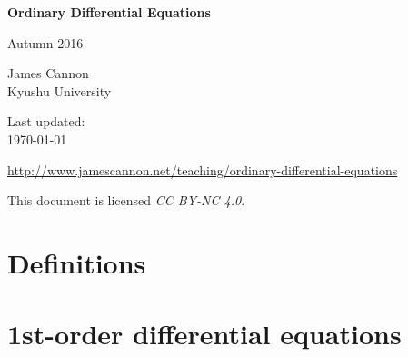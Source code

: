 \documentclass[a4paper]{book} %
\newcommand{\courseurl}{ordinary-differential-equations}
\begin{document}
\begin{titlepage}
    \begin{center}
        \vspace*{1cm}
        
        \Huge
        \textbf{Ordinary Differential Equations}

        Autumn 2016
        
        \vspace{2.0cm}
        \LARGE
        James Cannon\\Kyushu University
        
        \vspace{1.5cm}
        \Large
        Last updated:\\\today

        \vfill
        
        \normalsize
        \url{http://www.jamescannon.net/teaching/\courseurl}
        \vspace{0.5cm}

        \small
        This document is licensed \emph{CC BY-NC 4.0}.
        
    \end{center}
\end{titlepage}





\newpage
\tableofcontents


\chapter{Definitions}

\chapter{1st-order differential equations}

\end{document}
